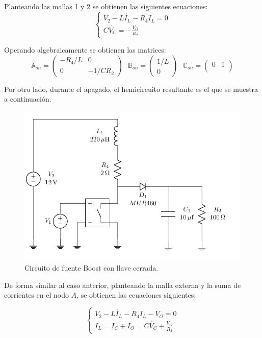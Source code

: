 Planteando las mallas 1 y 2 se obtienen las siguientes ecuaciones:
\begin{equation}
\begin{cases}
V_2 - L \dot{I_L} - R_4 I_L = 0 \\
C \dot{V_C} = -\frac{V_O}{R_2}
\end{cases}
\label{ej2:eq:on}
\end{equation}

Operando algebraicamente se obtienen las matrices: 
\begin{equation*}
\mathbb{A}_{on} =  \begin{pmatrix}
	-R_4/L & 0 \\
	0 & -1/ C R_2
\end{pmatrix} \ \ \
\mathbb{B}_{on} =  \begin{pmatrix}
	1/L \\
	0
\end{pmatrix} \ \ \
\mathbb{C}_{on} =  \begin{pmatrix}
	0 & 1 \\
\end{pmatrix}
\end{equation*}

Por otro lado, durante el apagado, el hemicircuito resultante es el que se muestra a continuación.

\begin{figure}[H]
	\centering
	\includegraphics[width=0.8\linewidth, page=3]{ImagenesEjercicio-2/CircuitsEj2}
	\caption{Circuito de fuente Boost con llave cerrada.}
	\label{fig:ej2:circuito_on}
\end{figure}

De forma similar al caso anterior, planteando la malla externa y la suma de corrientes en el nodo $A$, se obtienen las ecuaciones siguientes:

\begin{equation}
\begin{cases}
V_2 - L \dot{I_L} - R_4 I_L - V_O = 0 \\
I_L = I_C + I_O = C\dot{V_C} + \frac{V_O}{R_2}
\end{cases}
\label{ej2:eq:off}
\end{equation}

